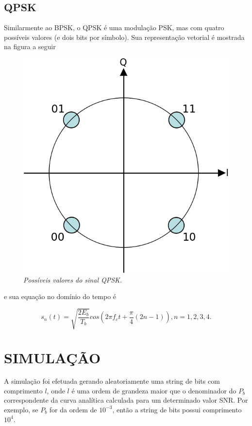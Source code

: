 \documentclass[a4paper,twocolumn]{article}
\begin{document}
\subsection{QPSK}

Similarmente ao BPSK, o QPSK é uma modulação PSK, mas com quatro possíveis valores (e dois bits por símbolo). Sua representação vetorial é mostrada na figura a seguir

\begin{figure}[h]
    \label{fig:qpsk_vector}
    \centering
    \includegraphics[scale=0.20]{qpsk-vector}
    \caption{\textit{Possíveis valores do sinal QPSK.}}
\end{figure}

\noindent e sua equação no domínio do tempo é

\begin{equation}
    \label{eq:qpsk_time}
    s_n(t) = \sqrt{\frac{2E_b}{T_b}}cos(2\pi f_c t + \frac{\pi}{4}(2n - 1)), n = 1, 2, 3, 4.
\end{equation}


\section{SIMULAÇÃO}

A simulação foi efetuada gerando aleatoriamente uma string de bits com comprimento $l$, onde $l$ é uma ordem de grandeza maior que o denominador do $P_b$ correspondente da curva analítica calculada para um determinado valor SNR. Por exemplo, se $P_b$ for da ordem de $10^{-3}$, então a string de bits possui comprimento $10^4$.
\end{document}
